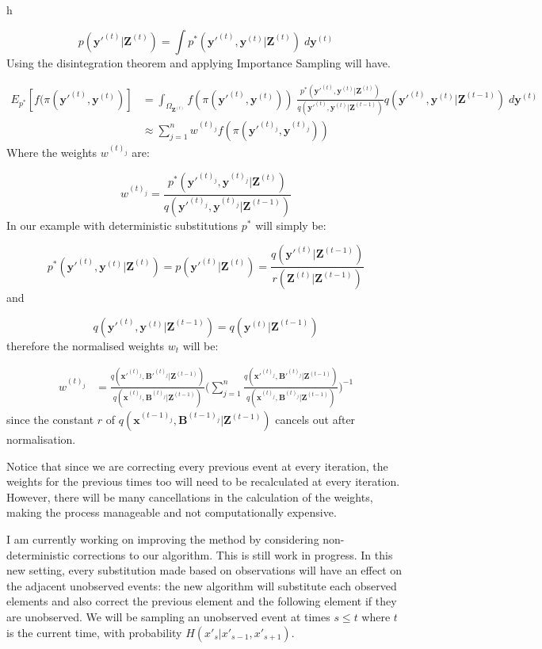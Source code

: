 h\documentclass[11pt,a4paper]{article}
\renewcommand{\vec}[1]{\mathbf{#1}}
\begin{document}
\[
p(\vec{y'}^{(t)} | \vec{Z}^{(t)}) = \int p^*(\vec{y'}^{(t)}, \vec{y}^{(t)} | \vec{Z}^{(t)})\; d\vec{y}^{(t)}
\]
Using the disintegration theorem and applying Importance Sampling will have.

\begin{align*}
E_{p^*}[f(\pi (\vec{y'}^{(t)}, \vec{y}^{(t)})] & = \int_{\Omega_{\vec{Z}^{(t)}}} f(\pi(\vec{y'}^{(t)},  \vec{y}^{(t)})) \; \frac{p^*(\vec{y'}^{(t)}, \vec{y}^{(t)}|\vec{Z}^{(t)})}{q(\vec{y'}^{(t)}, \vec{y}^{(t)} | \vec{Z}^{(t-1)})} q(\vec{y'}^{(t)}, \vec{y}^{(t)} | \vec{Z}^{(t-1)})\; d\vec{y}^{(t)} \\ &\approx \sum_{j=1}^n  w^{(t)_j}f(\pi (\vec{y'}^{(t)_j}, \vec{y}^{(t)_j}))
\end{align*}
Where the weights $w^{(t)_j}$ are:

\[
w^{(t)_j} = \frac{p^*(\vec{y'}^{(t)_j}, \vec{y}^{(t)_j} | \vec{Z}^{(t)})} {q(\vec{y'}^{(t)_j}, \vec{y}^{(t)_j}|\vec{Z}^{(t-1)})}
\]
In our example with deterministic substitutions $p^*$ will simply be:

\[
p^*(\vec{y'}^{(t)}, \vec{y}^{(t)} | \vec{Z}^{(t)}) = p(\vec{y'}^{(t)} | \vec{Z}^{(t)}) = \frac{ q(\vec{y'}^{(t)}|\vec{Z}^{(t-1)})} {r(\vec{Z}^{(t)} | \vec{Z}^{(t-1)})}
\]
and

\[
q(\vec{y'}^{(t)}, \vec{y}^{(t)} | \vec{Z}^{(t-1)}) = q(\vec{y}^{(t)} | \vec{Z}^{(t-1)})
\]
therefore the normalised weights $w_t$ will be:

\begin{align*}
w^{(t)_j} & = \frac{q(\vec{x'}^{(t)_j}, \vec{B'}^{(t)_j} | \vec{Z}^{(t-1)}) }{q(\vec{x}^{(t)_j}, \vec{B}^{(t)_j} | \vec{Z}^{(t-1)})}\Bigg( \sum_{j=1}^n \frac{q(\vec{x'}^{(t)_j}, \vec{B'}^{(t)_j} | \vec{Z}^{(t-1)}) }{q(\vec{x}^{(t)_j}, \vec{B}^{(t)_j} | \vec{Z}^{(t-1)})}\Bigg)^{-1}
\end{align*}
since the constant $r$ of $q(\vec{x}^{(t-1)_j},\vec{B}^{(t-1)_j} | \vec{Z}^{(t-1)})$ cancels out after normalisation.

Notice that since we are correcting every previous event at every iteration, the weights for the previous times too will need to be recalculated at every iteration. However, there will be many cancellations in the calculation of the weights, making the process manageable and not computationally expensive.

I am currently working on improving the method by considering non-deterministic corrections to our algorithm. This is still work in progress.
In this new setting, every substitution made based on observations will have an effect on the adjacent unobserved events: the new algorithm will substitute each observed elements and also correct the previous element and the following element if they are unobserved. We will be sampling an unobserved event at times $s\leq t$ where $t$ is the current time, with probability $H(x'_s|x'_{s-1}, x'_{s+1})$.
\end{document}
